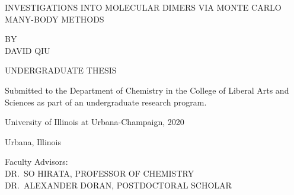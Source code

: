 \begin{titlepage}
\begin{center}
{ \Large
	\uppercase{Investigations into Molecular Dimers via Monte Carlo Many-Body Methods}

	\vspace{3 cm}

	\uppercase{BY \\ DAVID QIU}

	\vspace{3 cm}

	{\Large UNDERGRADUATE THESIS}

	\vspace{1 cm}

	{\large Submitted to the Department of Chemistry in the College of
	Liberal Arts and Sciences as part of an undergraduate research program.}

	\vspace{1 cm}

	{\large University of Illinois at Urbana-Champaign, 2020}

	\vspace{1 cm}

	{\large Urbana, Illinois}

}
\end{center}

\vfill

\begin{flushleft}

	{\large Faculty Advisors: \\
	DR.\ SO HIRATA, PROFESSOR OF CHEMISTRY \\
	DR.\ ALEXANDER DORAN, POSTDOCTORAL SCHOLAR}

\end{flushleft}
\end{titlepage}
